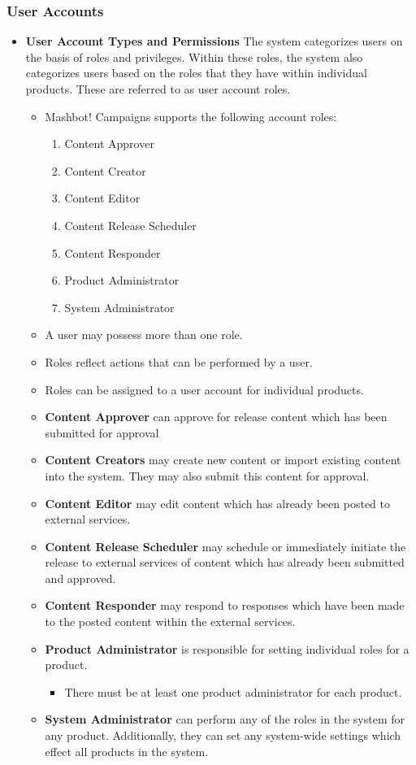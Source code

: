 \documentclass{article}
\begin{document}
		\subsubsection{User Accounts} %
			\begin{itemize}
				\item \textbf{User Account Types and Permissions} The system categorizes users on the basis
				of roles and privileges. Within these roles, the system also categorizes users based on
			 	the roles that they have within individual products.	These are referred to as user 
				account roles.
				\begin{itemize}
					\item Mashbot! Campaigns supports the following account roles:
						\begin{enumerate}
							\item Content Approver
							\item Content Creator
							\item Content Editor
							\item Content Release Scheduler
							\item Content Responder
							\item Product Administrator
							\item System Administrator
						\end{enumerate}
					\item A user may possess more than one role.
					\item Roles reflect actions that can be performed by a user.
					\item Roles can be assigned to a user account for individual products.
					\item \textbf{Content Approver} can approve for release content which has been
					submitted for approval
					\item \textbf{Content Creators} may create new content or import existing
					content into the system. They may also submit this content for approval.
					\item \textbf{Content Editor} may edit content which has already been posted to external
					services.
					\item \textbf{Content Release Scheduler} may schedule or immediately initiate the release 
					to external services of content which has already been submitted and approved.
					\item \textbf{Content Responder} may respond to responses which have been made to the posted 
					content within the external services.
				 	\item \textbf{Product Administrator} is responsible for setting individual roles for a product.
						\begin{itemize}
							\item There must be at least one product administrator for each product.
						\end{itemize}	
					\item \textbf{System Administrator} can perform any of the roles in the system for any product.
					Additionally, they can set any system-wide settings which effect all products in the system.
				\end{itemize}
			\end{itemize}
\end{document}
